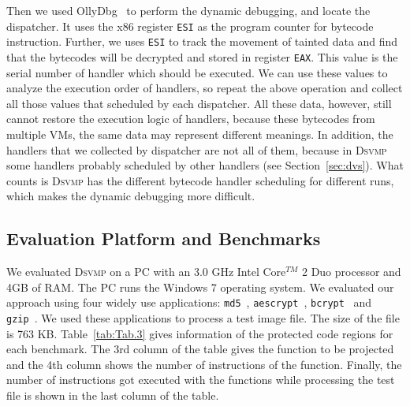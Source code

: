 \documentclass[conference]{IEEEtran}
\newcommand{\DSVMP}{\textsc{Dsvmp}\xspace}
\begin{document}
Then we used OllyDbg~\cite{15Ollydbg} to perform the dynamic debugging, and locate the dispatcher. It uses the x86 register \texttt{ESI} as the program counter for bytecode instruction. Further, we uses \texttt{ESI} to track the movement of tainted data and find that the bytecodes will be decrypted and stored in register \texttt{EAX}. This value is the serial number of handler which should be executed. We can use these values to analyze the execution order of handlers, so repeat the above operation and collect all those values that scheduled by each dispatcher. All these data, however, still cannot restore the execution logic of handlers, because these bytecodes from multiple VMs, the same data may represent different meanings. In addition, the handlers that we collected by dispatcher are not all of them, because in \DSVMP some handlers probably scheduled by other handlers (see Section~\ref{sec:dvs}). What counts is \DSVMP has the different bytecode handler scheduling for different runs, which makes the dynamic debugging more difficult.


\subsection{Evaluation Platform and Benchmarks}
We evaluated \DSVMP on a PC with an 3.0 GHz Intel Core$^{TM}$ 2 Duo processor and 4GB of RAM.
The PC runs the Windows 7 operating system. We evaluated our approach using four widely use applications: \texttt{md5}~\cite{19md5}, \texttt{aescrypt}~\cite{20Aescrypt}, \texttt{bcrypt}~\cite{21bcrypt} and \texttt{gzip}~\cite{22gzip}.
 We used these applications to process a test image file. The size of the file is 763 KB.
 Table~\ref{tab:Tab.3} gives information of the protected code regions for each benchmark.
 The 3rd column of the table gives the function to be projected and the 4th column shows the number of instructions of the function. Finally, the number of instructions got executed with the functions while processing the test file is shown in the last column of the table.
\end{document}
